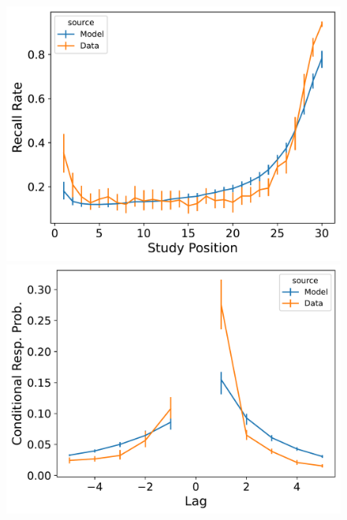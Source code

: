 \documentclass[
  letterpaper,
  11pt,
  english,
  singlespacing,
  headsepline]{MastersDoctoralThesis}
\begin{document}
\begin{figure}
\begin{minipage}{0.33\linewidth}
\includegraphics{icmr_figures/Murdock1962_ConnectionistCMR_Model_Fitting_LL30_spc-1.png}\end{minipage}%
\newline
\begin{minipage}{0.33\linewidth}
\includegraphics{icmr_figures/Murdock1962_InstanceCMR_Model_Fitting_LL30_crp-1.png}\end{minipage}%
%
\begin{minipage}{0.33\linewidth}

\end{minipage}
\end{figure}
\end{document}
